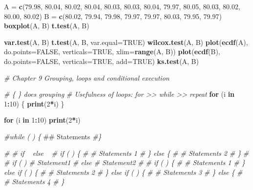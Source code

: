 \documentclass[10pt,]{krantz}
\makeatletter
\newenvironment{Shaded}{\begin{snugshade}}{\end{snugshade}}
\newcommand{\KeywordTok}[1]{\textcolor[rgb]{0.13,0.29,0.53}{\textbf{#1}}}
\newcommand{\DataTypeTok}[1]{\textcolor[rgb]{0.13,0.29,0.53}{#1}}
\newcommand{\DecValTok}[1]{\textcolor[rgb]{0.00,0.00,0.81}{#1}}
\newcommand{\FloatTok}[1]{\textcolor[rgb]{0.00,0.00,0.81}{#1}}
\newcommand{\StringTok}[1]{\textcolor[rgb]{0.31,0.60,0.02}{#1}}
\newcommand{\CommentTok}[1]{\textcolor[rgb]{0.56,0.35,0.01}{\textit{#1}}}
\newcommand{\OtherTok}[1]{\textcolor[rgb]{0.56,0.35,0.01}{#1}}
\newcommand{\ControlFlowTok}[1]{\textcolor[rgb]{0.13,0.29,0.53}{\textbf{#1}}}
\newcommand{\OperatorTok}[1]{\textcolor[rgb]{0.81,0.36,0.00}{\textbf{#1}}}
\newcommand{\NormalTok}[1]{#1}
\newenvironment{kframe}{%
\medskip{}
\setlength{\fboxsep}{.8em}
 \def\at@end@of@kframe{}%
 \ifinner\ifhmode%
  \def\at@end@of@kframe{\end{minipage}}%
  \begin{minipage}{\columnwidth}%
 \fi\fi%
 \def\FrameCommand##1{\hskip\@totalleftmargin \hskip-\fboxsep
 \colorbox{shadecolor}{##1}\hskip-\fboxsep
     \hskip-\linewidth \hskip-\@totalleftmargin \hskip\columnwidth}%
 \MakeFramed {\advance\hsize-\width
   \@totalleftmargin\z@ \linewidth\hsize
   \@setminipage}}%
 {\par\unskip\endMakeFramed%
 \at@end@of@kframe}
\renewenvironment{Shaded}{\begin{kframe}}{\end{kframe}}
\makeatother
\begin{document}
\begin{Shaded}
\begin{Highlighting}[]
\NormalTok{A =}\StringTok{ }\KeywordTok{c}\NormalTok{(}\FloatTok{79.98}\NormalTok{, }\FloatTok{80.04}\NormalTok{, }\FloatTok{80.02}\NormalTok{, }\FloatTok{80.04}\NormalTok{, }\FloatTok{80.03}\NormalTok{, }\FloatTok{80.03}\NormalTok{, }\FloatTok{80.04}\NormalTok{, }\FloatTok{79.97}\NormalTok{, }\FloatTok{80.05}\NormalTok{, }\FloatTok{80.03}\NormalTok{, }\FloatTok{80.02}\NormalTok{, }\FloatTok{80.00}\NormalTok{, }\FloatTok{80.02}\NormalTok{)}
\NormalTok{B =}\StringTok{ }\KeywordTok{c}\NormalTok{(}\FloatTok{80.02}\NormalTok{, }\FloatTok{79.94}\NormalTok{, }\FloatTok{79.98}\NormalTok{, }\FloatTok{79.97}\NormalTok{, }\FloatTok{79.97}\NormalTok{, }\FloatTok{80.03}\NormalTok{, }\FloatTok{79.95}\NormalTok{, }\FloatTok{79.97}\NormalTok{)}
\KeywordTok{boxplot}\NormalTok{(A, B)}
\KeywordTok{t.test}\NormalTok{(A, B)}

\KeywordTok{var.test}\NormalTok{(A, B)}
\KeywordTok{t.test}\NormalTok{(A, B, }\DataTypeTok{var.equal=}\OtherTok{TRUE}\NormalTok{)}
\KeywordTok{wilcox.test}\NormalTok{(A, B)}
\KeywordTok{plot}\NormalTok{(}\KeywordTok{ecdf}\NormalTok{(A), }\DataTypeTok{do.points=}\OtherTok{FALSE}\NormalTok{, }\DataTypeTok{verticals=}\OtherTok{TRUE}\NormalTok{, }\DataTypeTok{xlim=}\KeywordTok{range}\NormalTok{(A, B))}
\KeywordTok{plot}\NormalTok{(}\KeywordTok{ecdf}\NormalTok{(B), }\DataTypeTok{do.points=}\OtherTok{FALSE}\NormalTok{, }\DataTypeTok{verticals=}\OtherTok{TRUE}\NormalTok{, }\DataTypeTok{add=}\OtherTok{TRUE}\NormalTok{)}
\KeywordTok{ks.test}\NormalTok{(A, B)}

\CommentTok{# Chapter 9 Grouping, loops and conditional execution}

\CommentTok{# \{ \} does grouping}
\CommentTok{# Usefulness of loops: for >> while >> repeat}
\ControlFlowTok{for}\NormalTok{ (i }\ControlFlowTok{in} \DecValTok{1}\OperatorTok{:}\DecValTok{10}\NormalTok{) \{}
  \KeywordTok{print}\NormalTok{(}\DecValTok{2}\OperatorTok{*}\NormalTok{i)}
\NormalTok{\}}

\ControlFlowTok{for}\NormalTok{ (i }\ControlFlowTok{in} \DecValTok{1}\OperatorTok{:}\DecValTok{10}\NormalTok{) }\KeywordTok{print}\NormalTok{(}\DecValTok{2}\OperatorTok{*}\NormalTok{i)}

\CommentTok{#while (    ) \{}
\NormalTok{## Statements}
\CommentTok{#\}}

\CommentTok{# # if ~ else ~}
\CommentTok{# if (   ) \{}
\CommentTok{# # Statements 1}
\CommentTok{# \} else \{}
\CommentTok{# # Statements 2}
\CommentTok{# \}}
\CommentTok{# }
\CommentTok{# if (    ) # Statement1}
\CommentTok{# else # Statement2}
\CommentTok{# }
\CommentTok{# if (   ) \{}
\CommentTok{# # Statements 1}
\CommentTok{# \} else if (   ) \{}
\CommentTok{# # Statements 2}
\CommentTok{# \} else if (   ) \{}
\CommentTok{# # Statements 3}
\CommentTok{# \} else \{}
\CommentTok{# # Statements 4  }
\CommentTok{# \}}


\end{Highlighting}
\end{Shaded}
\end{document}
